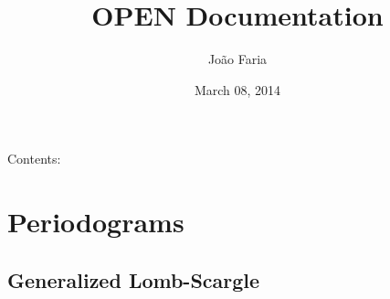 \documentclass[letterpaper,10pt,english]{sphinxmanual}
\title{OPEN Documentation}
\date{March 08, 2014}
\author{João Faria}
\begin{document}
\maketitle
\tableofcontents
{}\label{index::doc}


Contents:


\chapter{Periodograms}
\label{api:periodograms}\label{api::doc}\label{api:welcome-to-open-s-documentation}\label{api:module-OPEN.periodograms}\label{api:module-OPEN.periodograms}

\section{Generalized Lomb-Scargle}
\label{api:generalized-lomb-scargle}
\end{document}

